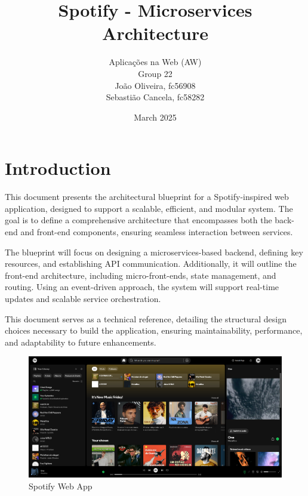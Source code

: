 \documentclass[a4paper,12pt]{article}
\title{Spotify - Microservices Architecture}
\author{
    Aplicações na Web (AW) \\
    Group 22 \\[0.3cm]
    João Oliveira, fc56908 \\ 
    Sebastião Cancela, fc58282
}
\date{March 2025}
\begin{document}
\maketitle
\tableofcontents
\newpage

\section{Introduction}

This document presents the architectural blueprint for a Spotify-inspired web application, designed to support a scalable, efficient, and modular system. The goal is to define a comprehensive architecture that encompasses both the back-end and front-end components, ensuring seamless interaction between services.

The blueprint will focus on designing a microservices-based backend, defining key resources, and establishing API communication. Additionally, it will outline the front-end architecture, including micro-front-ends, state management, and routing. Using an event-driven approach, the system will support real-time updates and scalable service orchestration.

This document serves as a technical reference, detailing the structural design choices necessary to build the application, ensuring maintainability, performance, and adaptability to future enhancements.

\begin{figure}[H]
    \centering
    \includegraphics[width=\linewidth]{images/a.png}
    \caption{Spotify Web App}
    \label{fig:spotify-web-app}
\end{figure}
\end{document}
